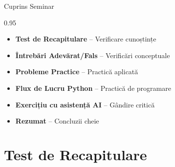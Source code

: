 \documentclass[9pt, aspectratio=169, t]{beamer}
\subtitle{Seminar 5: Modele GARCH}
\begin{document}
{
\begin{frame}
    \titlepage
\end{frame}
}

\begin{frame}{Cuprins Seminar}
    \begin{cminipage}{0.95\textwidth}
    \begin{itemize}\setlength{\itemsep}{0pt}
        \item \textbf{Test de Recapitulare} -- Verificare cunoștințe
        \vspace{0.15cm}
        \item \textbf{Întrebări Adevărat/Fals} -- Verificări conceptuale
        \vspace{0.15cm}
        \item \textbf{Probleme Practice} -- Practică aplicată
        \vspace{0.15cm}
        \item \textbf{Flux de Lucru Python} -- Practică de programare
        \vspace{0.15cm}
        \item \textbf{Exercițiu cu asistență AI} -- Gândire critică
        \vspace{0.15cm}
        \item \textbf{Rezumat} -- Concluzii cheie
    \end{itemize}
    \end{cminipage}
\end{frame}


\section{Test de Recapitulare}
\end{document}
